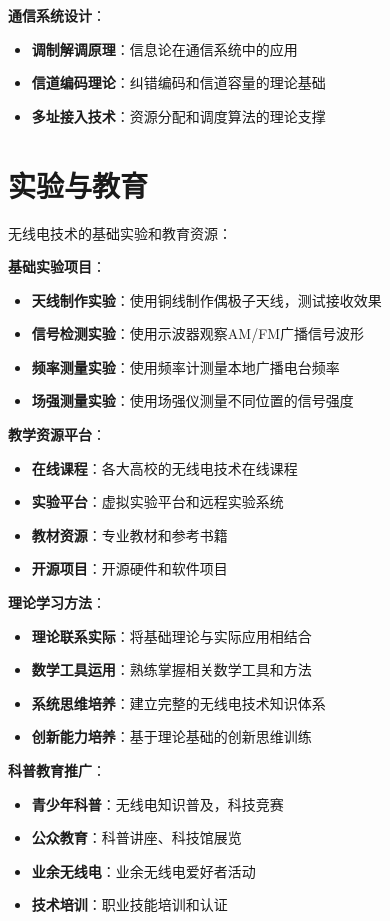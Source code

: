 \documentclass[12pt,UTF8]{ctexbook}
\begin{document}
\textbf{通信系统设计}：
\begin{itemize}[leftmargin=3.5em]
    \item \textbf{调制解调原理}：信息论在通信系统中的应用
    \item \textbf{信道编码理论}：纠错编码和信道容量的理论基础
    \item \textbf{多址接入技术}：资源分配和调度算法的理论支撑
\end{itemize}

\section{实验与教育}

无线电技术的基础实验和教育资源：

\textbf{基础实验项目}：
\begin{itemize}[leftmargin=3.5em]
    \item \textbf{天线制作实验}：使用铜线制作偶极子天线，测试接收效果
    \item \textbf{信号检测实验}：使用示波器观察AM/FM广播信号波形
    \item \textbf{频率测量实验}：使用频率计测量本地广播电台频率
    \item \textbf{场强测量实验}：使用场强仪测量不同位置的信号强度
\end{itemize}

\textbf{教学资源平台}：
\begin{itemize}[leftmargin=3.5em]
    \item \textbf{在线课程}：各大高校的无线电技术在线课程
    \item \textbf{实验平台}：虚拟实验平台和远程实验系统
    \item \textbf{教材资源}：专业教材和参考书籍
    \item \textbf{开源项目}：开源硬件和软件项目
\end{itemize}

\textbf{理论学习方法}：
\begin{itemize}[leftmargin=3.5em]
    \item \textbf{理论联系实际}：将基础理论与实际应用相结合
    \item \textbf{数学工具运用}：熟练掌握相关数学工具和方法
    \item \textbf{系统思维培养}：建立完整的无线电技术知识体系
    \item \textbf{创新能力培养}：基于理论基础的创新思维训练
\end{itemize}

\textbf{科普教育推广}：
\begin{itemize}[leftmargin=3.5em]
    \item \textbf{青少年科普}：无线电知识普及，科技竞赛
    \item \textbf{公众教育}：科普讲座、科技馆展览
    \item \textbf{业余无线电}：业余无线电爱好者活动
    \item \textbf{技术培训}：职业技能培训和认证
\end{itemize}
\end{document}
